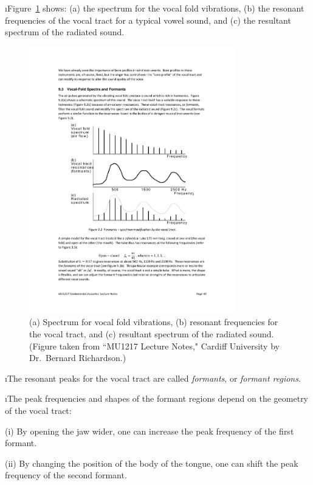 \i Figure~\ref{f:formants} shows:
(a) the spectrum for the vocal fold vibrations, 
(b) the resonant frequencies of the vocal tract 
for a typical vowel sound, and 
(c) the resultant spectrum of the radiated sound.
%
\begin{figure}[htbp]
\begin{center}
\includegraphics[width=0.8\textwidth]{formants}
\caption{(a) Spectrum for vocal fold vibrations,
(b) resonant frequencies for the vocal tract, and
(c) resultant spectrum of the radiated sound.
(Figure taken from 
``MU1217 Lecture Notes," Cardiff University
by Dr.~Bernard Richardson.)}
\label{f:formants}
\end{center}
\end{figure}
%

\i The resonant peaks for the vocal tract are called 
{\em formants}, or {\em formant regions}.

\i The peak frequencies and shapes of the formant
regions depend on the geometry of the vocal tract:

(i) By opening the jaw wider, one can increase the 
peak frequency of the first formant.

(ii) By changing the position of the body of the tongue,
one can shift the peak frequency of the second formant.

